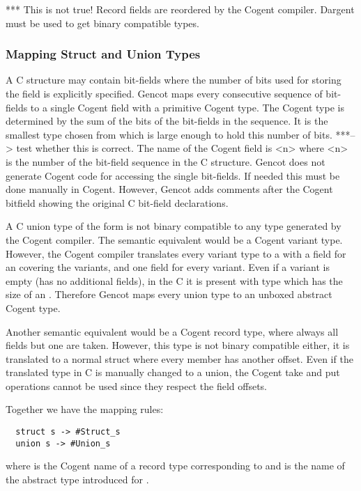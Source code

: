 *** This is not true! Record fields are reordered by the Cogent compiler. Dargent must be used to get binary compatible types.

\subsubsection{Mapping Struct and Union Types}
A C structure may contain bit-fields where the number of bits used for storing the field is explicitly specified.
Gencot maps every consecutive sequence of bit-fields to a single Cogent field with a primitive Cogent type.
The Cogent type is determined by the sum of the bits of the bit-fields in the sequence. It is the smallest 
type chosen from  which is large enough to hold this number of bits. 
***--> test whether this is correct.
The name of the
Cogent field is <n> where <n> is the number of the bit-field sequence in the C structure.
Gencot does not generate Cogent code for accessing the single bit-fields. If needed this must be done manually in Cogent.
However, Gencot adds comments after the Cogent bitfield showing the original C bit-field declarations.

A C union type of the form  is not binary compatible to any type generated by the Cogent compiler.
The semantic equivalent would be a Cogent variant type. However, the Cogent compiler translates every variant type
to a  with a field for an  covering the variants, and one field for every variant. Even if a variant
is empty (has no additional fields), in the C  it is present with type  which
has the size of an . Therefore Gencot maps every union type to an unboxed abstract Cogent type.

Another semantic equivalent would be a Cogent record type, where always all fields but one are taken. However,
this type is not binary compatible either, it is translated to a normal struct where every member has another
offset. Even if the translated type in C is manually changed to a union, the Cogent take and put operations cannot
be used since they respect the field offsets. 

Together we have the mapping rules:
\begin{verbatim}
  struct s -> #Struct_s
  union s -> #Union_s
\end{verbatim}
where  is the Cogent name of a record type corresponding to  and  is the
name of the abstract type introduced for .

